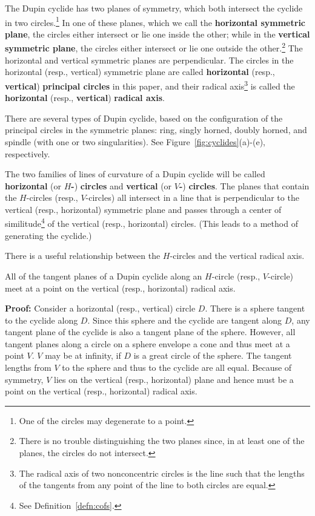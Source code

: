 \begin{definition}
The Dupin cyclide has two planes of symmetry, which both intersect
the cyclide in two circles.\footnote{One of the circles may degenerate
	to a point.}
In one of these planes, which we call the {\bf horizontal symmetric plane},
the circles either intersect or lie one inside the other;
while in the {\bf vertical symmetric plane}, the circles either intersect
or lie one outside the other.\footnote{There is no trouble distinguishing
	the two planes since, in at least one of the planes, the circles
	do not intersect.}
The horizontal and vertical symmetric planes are perpendicular.
The circles in the horizontal (resp., vertical) symmetric plane are called
{\bf horizontal} (resp., {\bf vertical}) {\bf principal circles} in this 
paper, and their radical axis\footnote{The radical axis of two 
	nonconcentric circles is the line such that
	the lengths of the tangents from any point of the line to both
	circles are equal.}
is called the {\bf horizontal} (resp., {\bf vertical}) {\bf radical axis}.
\end{definition}

There are several types of Dupin cyclide, based on the configuration of
the principal circles in the symmetric planes:
ring, singly horned, doubly horned, and spindle (with one or two 
singularities).  See Figure~\ref{fig:cyclides}(a)-(e), respectively.

\begin{definition}
\label{defn:HV}
The two families of lines of curvature of a Dupin cyclide will be called
{\bf horizontal} (or {\bf $H$-}) {\bf circles} and
{\bf vertical} (or {\bf $V$-}) {\bf circles}.
The planes that contain the $H$-circles (resp., $V$-circles)
all intersect in a line that is perpendicular to the vertical 
(resp., horizontal) symmetric plane and passes through a center of
similitude\footnote{See Definition~\ref{defn:cofs}.}
of the vertical (resp., horizontal) circles.
(This leads to a method of generating the cyclide.)
\end{definition}

There is a useful relationship between the $H$-circles and the vertical
radical axis.

\begin{lemma}
\label{lemma:on-radical-axis}
     All of the tangent planes of a Dupin cyclide along an $H$-circle 
(resp., $V$-circle) meet at a point on the vertical (resp., horizontal)
radical axis.
\end{lemma}
{\bf Proof:}
Consider a horizontal (resp., vertical) circle $D$.  There is a
sphere tangent to the cyclide along $D$.  Since this sphere and the cyclide are
tangent along $D$, any tangent plane of the cyclide is also a tangent plane of
the sphere.  However, all tangent planes along a circle on a sphere envelope a
cone and thus meet at a point $V$.  $V$ may be at
infinity, if $D$ is a great circle of the sphere.  The tangent lengths from
$V$ to the sphere and thus to the cyclide are all equal.  Because of symmetry,
$V$ lies on the vertical (resp., horizontal) plane and hence must be a point
on the vertical (resp., horizontal) radical axis. 
\QED

